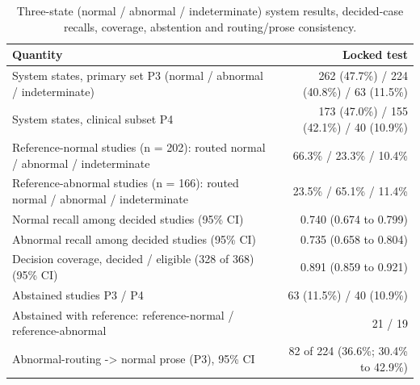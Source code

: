 \begin{table}[t]
\centering
\scriptsize
\begin{tabular}{lr}
\hline
Quantity & Locked test \\
\hline
System states, primary set P3 (normal / abnormal / indeterminate) & 262 (47.7\%) / 224 (40.8\%) / 63 (11.5\%) \\
System states, clinical subset P4 & 173 (47.0\%) / 155 (42.1\%) / 40 (10.9\%) \\
Reference-normal studies (n = 202): routed normal / abnormal / indeterminate & 66.3\% / 23.3\% / 10.4\% \\
Reference-abnormal studies (n = 166): routed normal / abnormal / indeterminate & 23.5\% / 65.1\% / 11.4\% \\
Normal recall among decided studies (95\% CI) & 0.740 (0.674 to 0.799) \\
Abnormal recall among decided studies (95\% CI) & 0.735 (0.658 to 0.804) \\
Decision coverage, decided / eligible (328 of 368) (95\% CI) & 0.891 (0.859 to 0.921) \\
Abstained studies P3 / P4 & 63 (11.5\%) / 40 (10.9\%) \\
Abstained with reference: reference-normal / reference-abnormal & 21 / 19 \\
Abnormal-routing -> normal prose (P3), 95\% CI & 82 of 224 (36.6\%; 30.4\% to 42.9\%) \\
\hline
\end{tabular}
\caption{Three-state (normal / abnormal / indeterminate) system results, decided-case recalls, coverage, abstention and routing/prose consistency.}
\label{tab:table6_three_state_system_metrics}
\end{table}
